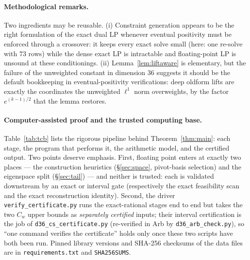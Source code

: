 \documentclass[11pt]{article}
\theoremstyle{remark}
\begin{document}
\paragraph{Methodological remarks.} Two ingredients may be reusable.
(i) Constraint generation appears to be the right formulation of the
exact dual LP whenever eventual positivity must be enforced through a
crossover: it keeps every exact solve small (here: one re-solve with
$73$ rows) while the dense exact LP is intractable and floating-point
LP is unsound at these conditionings. (ii) Lemma~\ref{lem:liftaware} is
elementary, but the failure of the unweighted constant in dimension
$36$ suggests it should be the default bookkeeping in
eventual-positivity verifications: deep oldform lifts are exactly the
coordinates the unweighted $\ell^1$ norm overweights, by the factor
$e^{(k-1)/2}$ that the lemma restores.

\paragraph{Computer-assisted proof and the trusted computing base.}
Table~\ref{tab:tcb} lists the rigorous pipeline behind
Theorem~\ref{thm:main}: each stage, the program that performs it, the
arithmetic model, and the certified output. Two points deserve emphasis.
First, floating point enters at exactly two places --- the construction
heuristics (\S\ref{sec:space}, pivot-basis selection) and the eigenspace
split (\S\ref{sec:tail}) --- and neither is trusted: each is validated
downstream by an exact or interval gate (respectively the exact
feasibility scan and the exact reconstruction identity). Second, the
driver \texttt{verify\_certificate.py} runs the exact-rational stages end
to end but takes the two $C_w$ upper bounds as \emph{separately
certified} inputs; their interval certification is the job of
\texttt{d36\_cs\_certificate.py} (re-verified in Arb by
\texttt{d36\_arb\_check.py}), so ``one command verifies the certificate''
holds only once these two scripts have both been run. Pinned library
versions and SHA-256 checksums of the data files are in
\texttt{requirements.txt} and \texttt{SHA256SUMS}.
\end{document}

